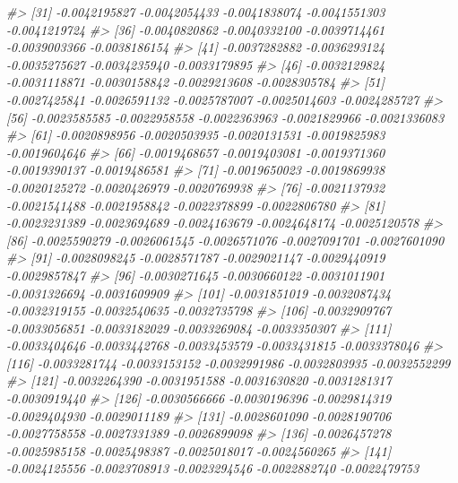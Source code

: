 \documentclass[
]{article}
\newenvironment{Shaded}{\begin{snugshade}}{\end{snugshade}}
\newcommand{\CommentTok}[1]{\textcolor[rgb]{0.56,0.35,0.01}{\textit{#1}}}
\begin{document}
\begin{Shaded}
\begin{Highlighting}[]
\CommentTok{\#\textgreater{}  [31] {-}0.0042195827 {-}0.0042054433 {-}0.0041838074 {-}0.0041551303 {-}0.0041219724}
\CommentTok{\#\textgreater{}  [36] {-}0.0040820862 {-}0.0040332100 {-}0.0039714461 {-}0.0039003366 {-}0.0038186154}
\CommentTok{\#\textgreater{}  [41] {-}0.0037282882 {-}0.0036293124 {-}0.0035275627 {-}0.0034235940 {-}0.0033179895}
\CommentTok{\#\textgreater{}  [46] {-}0.0032129824 {-}0.0031118871 {-}0.0030158842 {-}0.0029213608 {-}0.0028305784}
\CommentTok{\#\textgreater{}  [51] {-}0.0027425841 {-}0.0026591132 {-}0.0025787007 {-}0.0025014603 {-}0.0024285727}
\CommentTok{\#\textgreater{}  [56] {-}0.0023585585 {-}0.0022958558 {-}0.0022363963 {-}0.0021829966 {-}0.0021336083}
\CommentTok{\#\textgreater{}  [61] {-}0.0020898956 {-}0.0020503935 {-}0.0020131531 {-}0.0019825983 {-}0.0019604646}
\CommentTok{\#\textgreater{}  [66] {-}0.0019468657 {-}0.0019403081 {-}0.0019371360 {-}0.0019390137 {-}0.0019486581}
\CommentTok{\#\textgreater{}  [71] {-}0.0019650023 {-}0.0019869938 {-}0.0020125272 {-}0.0020426979 {-}0.0020769938}
\CommentTok{\#\textgreater{}  [76] {-}0.0021137932 {-}0.0021541488 {-}0.0021958842 {-}0.0022378899 {-}0.0022806780}
\CommentTok{\#\textgreater{}  [81] {-}0.0023231389 {-}0.0023694689 {-}0.0024163679 {-}0.0024648174 {-}0.0025120578}
\CommentTok{\#\textgreater{}  [86] {-}0.0025590279 {-}0.0026061545 {-}0.0026571076 {-}0.0027091701 {-}0.0027601090}
\CommentTok{\#\textgreater{}  [91] {-}0.0028098245 {-}0.0028571787 {-}0.0029021147 {-}0.0029440919 {-}0.0029857847}
\CommentTok{\#\textgreater{}  [96] {-}0.0030271645 {-}0.0030660122 {-}0.0031011901 {-}0.0031326694 {-}0.0031609909}
\CommentTok{\#\textgreater{} [101] {-}0.0031851019 {-}0.0032087434 {-}0.0032319155 {-}0.0032540635 {-}0.0032735798}
\CommentTok{\#\textgreater{} [106] {-}0.0032909767 {-}0.0033056851 {-}0.0033182029 {-}0.0033269084 {-}0.0033350307}
\CommentTok{\#\textgreater{} [111] {-}0.0033404646 {-}0.0033442768 {-}0.0033453579 {-}0.0033431815 {-}0.0033378046}
\CommentTok{\#\textgreater{} [116] {-}0.0033281744 {-}0.0033153152 {-}0.0032991986 {-}0.0032803935 {-}0.0032552299}
\CommentTok{\#\textgreater{} [121] {-}0.0032264390 {-}0.0031951588 {-}0.0031630820 {-}0.0031281317 {-}0.0030919440}
\CommentTok{\#\textgreater{} [126] {-}0.0030566666 {-}0.0030196396 {-}0.0029814319 {-}0.0029404930 {-}0.0029011189}
\CommentTok{\#\textgreater{} [131] {-}0.0028601090 {-}0.0028190706 {-}0.0027758558 {-}0.0027331389 {-}0.0026899098}
\CommentTok{\#\textgreater{} [136] {-}0.0026457278 {-}0.0025985158 {-}0.0025498387 {-}0.0025018017 {-}0.0024560265}
\CommentTok{\#\textgreater{} [141] {-}0.0024125556 {-}0.0023708913 {-}0.0023294546 {-}0.0022882740 {-}0.0022479753}

\end{Highlighting}
\end{Shaded}
\end{document}
